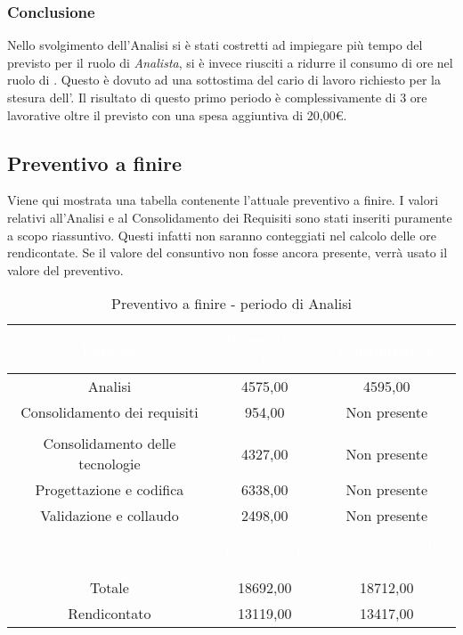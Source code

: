 \subsubsection{Conclusione}
Nello svolgimento dell'Analisi si è stati costretti ad impiegare più tempo del previsto per il ruolo di \textit{Analista}, si è invece riusciti a ridurre il consumo di ore nel ruolo di \Amministratore. Questo è dovuto ad una sottostima del cario di lavoro richiesto per la stesura dell'\AdRv{}. Il risultato di questo primo periodo è complessivamente di 3 ore lavorative oltre il previsto con una spesa aggiuntiva di 20,00€.
\subsection{Preventivo a finire}
Viene qui mostrata una tabella contenente l'attuale preventivo a finire. I valori relativi all'Analisi e al Consolidamento dei Requisiti sono stati inseriti puramente a scopo riassuntivo. Questi infatti non saranno conteggiati nel calcolo delle ore rendicontate. Se il valore del consuntivo non fosse ancora presente, verrà usato il valore del preventivo.
\begin{table}[H]
	\centering
	\begin{tabular}{|c|c|c|}
	\rowcolor{darkblue} 
		\textcolor{white}{Periodo}	&\textcolor{white}{Preventivo €}	&	\textcolor{white}{Consuntivo €} \\ \hline
		Analisi					&	4575,00				&	4595,00  \\ \hline
		Consolidamento dei requisiti	&	954,00				&	Non presente  \\ \hline
		\rowcolor{darkblue} \multicolumn{3}{|c|}{\textcolor{white}{Rendicontato}}  \\ \hline
		Consolidamento delle tecnologie	&	4327,00				&	Non presente  \\ \hline
		Progettazione e codifica		&	6338,00				&	Non presente  \\ \hline
		Validazione e collaudo		&	2498,00				&	Non presente  \\ \hline
		\rowcolor{darkblue}		&\textcolor{white}{Preventivo €}	&	\textcolor{white}{Preventivo a finire €} \\ \hline
		Totale					&	18692,00				&	18712,00 \\ \hline
		Rendicontato			&	13119,00				&	13417,00 \\ \hline
	\end{tabular}
	\caption{Preventivo a finire - periodo di Analisi}
\end{table}